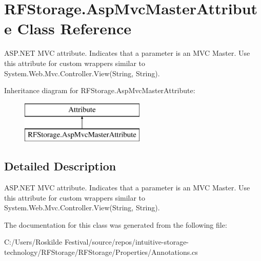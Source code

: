 \section{R\+F\+Storage.\+Asp\+Mvc\+Master\+Attribute Class Reference}
\label{class_r_f_storage_1_1_asp_mvc_master_attribute}


A\+S\+P.\+N\+ET M\+VC attribute. Indicates that a parameter is an M\+VC Master. Use this attribute for custom wrappers similar to {\ttfamily System.\+Web.\+Mvc.\+Controller.\+View(\+String, String)}.  


Inheritance diagram for R\+F\+Storage.\+Asp\+Mvc\+Master\+Attribute\+:\begin{figure}[H]
\begin{center}
\leavevmode
\includegraphics[height=2.000000cm]{class_r_f_storage_1_1_asp_mvc_master_attribute}
\end{center}
\end{figure}


\subsection{Detailed Description}
A\+S\+P.\+N\+ET M\+VC attribute. Indicates that a parameter is an M\+VC Master. Use this attribute for custom wrappers similar to {\ttfamily System.\+Web.\+Mvc.\+Controller.\+View(\+String, String)}. 



The documentation for this class was generated from the following file\+:\begin{DoxyCompactItemize}
\item 
C\+:/\+Users/\+Roskilde Festival/source/repos/intuitive-\/storage-\/technology/\+R\+F\+Storage/\+R\+F\+Storage/\+Properties/Annotations.\+cs\end{DoxyCompactItemize}
